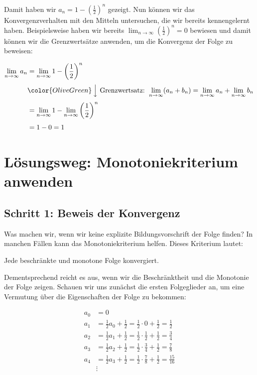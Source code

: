\documentclass[fontsize=9pt,
               parskip=half-,
               DIV=14,
               listof=chapterentry,
               tocflat]{scrbook}
\begin{document}
Damit haben wir $a_{n}=1-\left({\frac {1}{2}}\right)^{n}$ gezeigt. Nun können wir das Konvergenzverhalten mit den Mitteln untersuchen, die wir bereits kennengelernt haben. Beispielsweise haben wir bereits $\lim _{n\to \infty }\left({\frac {1}{2}}\right)^{n}=0$ bewiesen und damit können wir die Grenzwertsätze anwenden, um die Konvergenz der Folge zu beweisen:

\begin{align*}
\lim _{n\to \infty }a_{n}&=\lim _{n\to \infty }1-\left({\frac {1}{2}}\right)^{n}\\[0.3em]&{\color {OliveGreen}\left\downarrow \ {\text{Grenzwertsatz: }}\lim _{n\to \infty }(a_{n}+b_{n})=\lim _{n\to \infty }a_{n}+\lim _{n\to \infty }b_{n}\right.}\\[0.3em]&=\lim _{n\to \infty }1-\lim _{n\to \infty }\left({\frac {1}{2}}\right)^{n}\\[0.3em]&=1-0=1
\end{align*}

\section{Lösungsweg: Monotoniekriterium anwenden}

\subsection{Schritt 1: Beweis der Konvergenz}

Was machen wir, wenn wir keine explizite Bildungsvorschrift der Folge finden? In manchen Fällen kann das Monotoniekriterium helfen. Dieses Kriterium lautet:

\begin{importantparagraph*}
Jede beschränkte und monotone Folge konvergiert.

\end{importantparagraph*}

Dementsprechend reicht es aus, wenn wir die Beschränktheit und die Monotonie der Folge zeigen. Schauen wir uns zunächst die ersten Folgeglieder an, um eine Vermutung über die Eigenschaften der Folge zu bekommen:

\begin{align*}
a_{0}&=0\\[0.3em]a_{1}&={\frac {1}{2}}a_{0}+{\frac {1}{2}}={\frac {1}{2}}\cdot 0+{\frac {1}{2}}={\frac {1}{2}}\\[0.3em]a_{2}&={\frac {1}{2}}a_{1}+{\frac {1}{2}}={\frac {1}{2}}\cdot {\frac {1}{2}}+{\frac {1}{2}}={\frac {3}{4}}\\[0.3em]a_{3}&={\frac {1}{2}}a_{2}+{\frac {1}{2}}={\frac {1}{2}}\cdot {\frac {3}{4}}+{\frac {1}{2}}={\frac {7}{8}}\\[0.3em]a_{4}&={\frac {1}{2}}a_{3}+{\frac {1}{2}}={\frac {1}{2}}\cdot {\frac {7}{8}}+{\frac {1}{2}}={\frac {15}{16}}\\[0.3em]&\vdots 
\end{align*}
\end{document}
